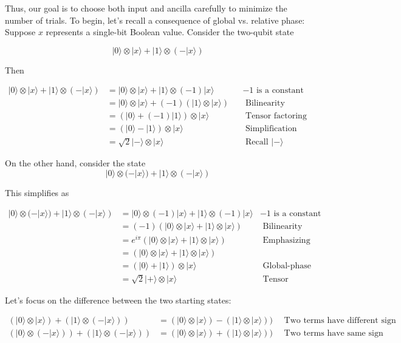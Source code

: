 \documentclass[main.tex]{subfiles}
\begin{document}
    Thus, our goal is to choose both input and ancilla carefully to minimize the number of trials. To begin, let's recall a consequence of global vs. relative phase: Suppose $x$ represents a single-bit Boolean value. Consider the two-qubit state
    
    $$
    |0\rangle \otimes|x\rangle+|1\rangle \otimes(-|x\rangle)
    $$
    
    Then
    
    $$
    \begin{aligned}
    |0\rangle \otimes|x\rangle+|1\rangle \otimes(-|x\rangle) &=|0\rangle \otimes|x\rangle+|1\rangle \otimes(-1)|x\rangle & &-1 \text { is a constant } \\
    &=|0\rangle \otimes|x\rangle+(-1)(|1\rangle \otimes|x\rangle) & & \text { Bilinearity } \\
    &=(|0\rangle+(-1)|1\rangle) \otimes|x\rangle & & \text { Tensor factoring } \\
    &=(|0\rangle-|1\rangle) \otimes|x\rangle & & \text { Simplification } \\
    &=\sqrt{2}|-\rangle \otimes|x\rangle & & \text { Recall }|-\rangle
    \end{aligned}
    $$
    
    On the other hand, consider the state
    $$
    |0\rangle \otimes(-|x\rangle)+|1\rangle \otimes(-|x\rangle)
    $$
    
    This simplifies as
    
    $$
    \begin{array}{rlr}
    |0\rangle \otimes(-|x\rangle)+|1\rangle \otimes(-|x\rangle) & =|0\rangle \otimes(-1)|x\rangle+|1\rangle \otimes(-1)|x\rangle & -1 \text { is a constant } \\
    & =(-1)(|0\rangle \otimes|x\rangle+|1\rangle \otimes|x\rangle) & \text { Bilinearity } \\
    & =e^{i \pi}(|0\rangle \otimes|x\rangle+|1\rangle \otimes|x\rangle) & \text { Emphasizing phase } \\
    & =(|0\rangle \otimes|x\rangle+|1\rangle \otimes|x\rangle) & \\
    & =(|0\rangle+|1\rangle) \otimes|x\rangle & \text { Global-phase equivalence } \\
    & =\sqrt{2}|+\rangle \otimes|x\rangle & \text { Tensor factoring }
    \end{array}
    $$
    
    Let's focus on the difference between the two starting states:
    
    $$
    \begin{aligned}
    (|0\rangle \otimes|x\rangle)+(|1\rangle \otimes(-|x\rangle)) &=(|0\rangle \otimes|x\rangle)-(|1\rangle \otimes|x\rangle)) \quad \text { Two terms have different sign } \\
    (|0\rangle \otimes(-|x\rangle))+(|1\rangle \otimes(-|x\rangle)) &=(|0\rangle \otimes|x\rangle)+(|1\rangle \otimes|x\rangle)) \quad \text { Two terms have same sign }
    \end{aligned}
    $$
    
\end{document}
